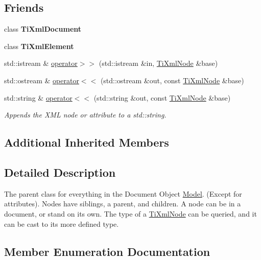 \subsection*{Friends}
\begin{DoxyCompactItemize}
\item 
\hypertarget{class_ti_xml_node_a173617f6dfe902cf484ce5552b950475}{}\label{class_ti_xml_node_a173617f6dfe902cf484ce5552b950475} 
class {\bfseries Ti\+Xml\+Document}
\item 
\hypertarget{class_ti_xml_node_ab6592e32cb9132be517cc12a70564c4b}{}\label{class_ti_xml_node_ab6592e32cb9132be517cc12a70564c4b} 
class {\bfseries Ti\+Xml\+Element}
\item 
std\+::istream \& \hyperlink{class_ti_xml_node_ab57bd426563c926844f65a78412e18b9}{operator$>$$>$} (std\+::istream \&in, \hyperlink{class_ti_xml_node}{Ti\+Xml\+Node} \&base)
\item 
std\+::ostream \& \hyperlink{class_ti_xml_node_a86cd49cfb17a844c0010b3136ac966c7}{operator$<$$<$} (std\+::ostream \&out, const \hyperlink{class_ti_xml_node}{Ti\+Xml\+Node} \&base)
\item 
\hypertarget{class_ti_xml_node_a52ef17e7080df2490cf87bde380685ab}{}\label{class_ti_xml_node_a52ef17e7080df2490cf87bde380685ab} 
std\+::string \& \hyperlink{class_ti_xml_node_a52ef17e7080df2490cf87bde380685ab}{operator$<$$<$} (std\+::string \&out, const \hyperlink{class_ti_xml_node}{Ti\+Xml\+Node} \&base)
\begin{DoxyCompactList}\small\item\em Appends the X\+ML node or attribute to a std\+::string. \end{DoxyCompactList}\end{DoxyCompactItemize}
\subsection*{Additional Inherited Members}


\subsection{Detailed Description}
The parent class for everything in the Document Object \hyperlink{class_model}{Model}. (Except for attributes). Nodes have siblings, a parent, and children. A node can be in a document, or stand on its own. The type of a \hyperlink{class_ti_xml_node}{Ti\+Xml\+Node} can be queried, and it can be cast to its more defined type. 

\subsection{Member Enumeration Documentation}
\hypertarget{class_ti_xml_node_a836eded4920ab9e9ef28496f48cd95a2}{}\label{class_ti_xml_node_a836eded4920ab9e9ef28496f48cd95a2} 
